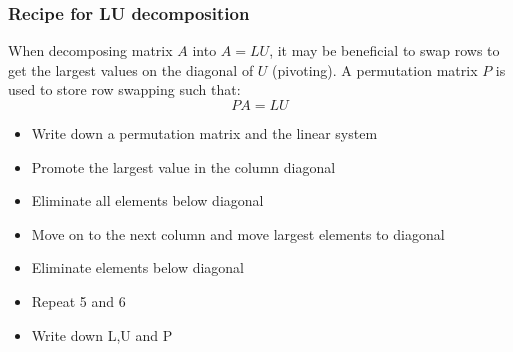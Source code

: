 \documentclass[11pt,table,final,xcolor={usenames,dvipsnames,table}]{beamer}
\begin{document}
% 

\begin{frame}[fragile]
  \frametitle{Recipe for LU decomposition}
   When decomposing matrix $A$ into $A=LU$, it may be beneficial to swap rows to get the largest values on the diagonal of $U$ (pivoting). A permutation matrix $P$ is used to store row swapping such that:
   \[
    PA = LU
   \]
  \begin{itemize}
    \item Write down a permutation matrix and the linear system
    \item Promote the largest value in the column diagonal
    \item Eliminate all elements below diagonal
    \item Move on to the next column and move largest elements to diagonal
    \item Eliminate elements below diagonal
    \item Repeat 5 and 6
    \item Write down L,U and P
  \end{itemize}
\end{frame}
\end{document}

